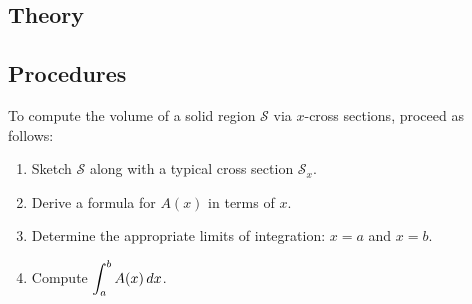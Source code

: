  \subsection*{Theory}




\subsection*{Procedures}
\begin{namedtheorem} To compute the volume of a solid region $\mathcal{S}$ via $x$-cross sections, proceed as follows:
\begin{enumerate}
  \item Sketch $\mathcal{S}$ along with a typical cross section $\mathcal{S}_x$.
  \item Derive a formula for $A(x)$ in terms of $x$.
  \item Determine the appropriate limits of integration: $x=a$ and $x=b$.
  \item Compute $\displaystyle \int_a^b A(x)\, dx$.
\end{enumerate}

\end{namedtheorem}

